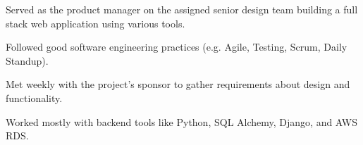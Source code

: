 \documentclass[]{latex/resume}
\begin{document}
\begin{minipage}[t]{0.75\textwidth}
     
    \begin{tightemize}
        \item Served as the product manager on the assigned senior design team building a full stack web application using various tools.
        \item Followed good software engineering practices (e.g. Agile, Testing, Scrum, Daily Standup).
        \item Met weekly with the project's sponsor to gather requirements about design and functionality.
        \item Worked mostly with backend tools like Python, SQL Alchemy, Django, and AWS RDS.
    \end{tightemize}

    \sectionsep




%
%   

\end{minipage} 
\hfill
\end{document}
